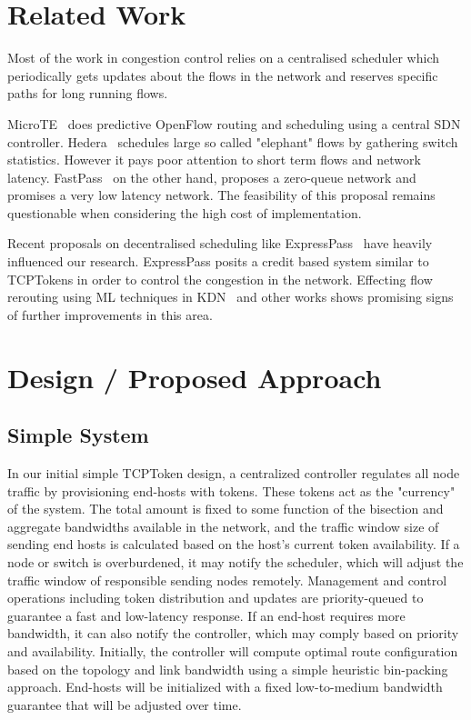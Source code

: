 \documentclass[sigconf]{acmart}
\begin{document}
\section{Related Work}
\label{sec:related}

Most of the work in congestion control relies on a centralised scheduler which periodically gets updates about the flows in the network and reserves specific paths for long running flows.

MicroTE~\cite{microte} does predictive OpenFlow routing and scheduling using a central SDN controller. Hedera~\cite{hedera} schedules large so called "elephant" flows by gathering switch statistics. However it pays poor attention to short term flows and network latency. FastPass~\cite{fastpass} on the other hand, proposes a zero-queue network and promises a very low latency network. The feasibility of this proposal remains questionable when considering the high cost of implementation.

Recent proposals on decentralised scheduling like ExpressPass~\cite{expresspass} have heavily influenced our research. ExpressPass posits a credit based system similar to TCPTokens in order to control the congestion in the network. Effecting flow rerouting using ML techniques in KDN~\cite{kdn} and other works shows promising signs of further improvements in this area.

\section{Design / Proposed Approach}
\label{sec:design}

\subsection{Simple System}
In our initial simple TCPToken design, a centralized controller regulates all node traffic by provisioning end-hosts with tokens.
These tokens act as the "currency" of the system. The total amount is fixed to some function of the bisection and aggregate bandwidths available in the network, and the traffic window size of sending end hosts is calculated based on the host's current token availability. If a node or switch is overburdened, it may notify the scheduler, which will adjust the traffic window of responsible sending nodes remotely. Management and control operations including token distribution and updates are priority-queued to guarantee a fast and low-latency response. If an end-host requires more bandwidth, it can also notify the controller, which may comply based on priority and availability.
Initially, the controller will compute optimal route configuration based on the topology and link bandwidth using a simple heuristic bin-packing approach. End-hosts will be initialized with a fixed low-to-medium bandwidth guarantee that will be adjusted over time.
\end{document}
